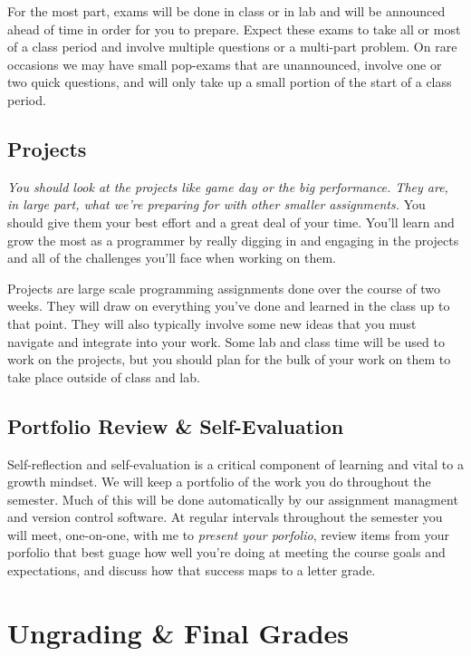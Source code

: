 \documentclass[10pt]{article}
\begin{document}
For the most part, exams will be done in class or in lab and will be announced ahead of time in order
for you to prepare.  Expect these exams to take all or most of a class period and involve multiple
questions or a multi-part problem. On rare occasions we may have small pop-exams that are unannounced,
involve one or two quick questions, and will only take up a small portion of the start of a class period.

\subsection*{Projects}

\textit{You should look at the projects like game day or the big performance. They are, in large part,
what we're preparing for with other smaller assignments.} You should give them your best effort and a
great deal of your time. You'll learn and grow the most as a programmer by really digging in and engaging
in the projects and all of the challenges you'll face when working on them.

Projects are large scale programming assignments done over the course of two weeks. They will
draw on everything you've done and learned in the class up to that point. They will also typically
involve some new ideas that you must navigate and integrate into your work. Some lab and class time
will be used to work on the projects, but you should plan for the bulk of your work on them to take
place outside of class and lab.


\subsection*{Portfolio Review \& Self-Evaluation}

Self-reflection and self-evaluation is a critical component of learning and vital to a growth mindset.
We will keep a portfolio of the work you do throughout the semester. Much of this will be done automatically
by our assignment managment and version control software. At regular intervals throughout the semester you will
meet, one-on-one, with me to \textit{present your porfolio}, review items from your porfolio that best 
guage how well you're doing at meeting the course goals and expectations, and discuss how that success maps to 
a letter grade.  



\section{Ungrading \& Final Grades}
\end{document}
